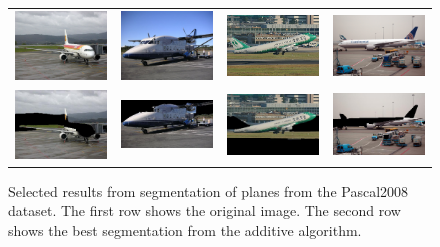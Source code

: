 \documentclass[10pt,twocolumn,letterpaper]{article}
\begin{document}
\begin{figure}[p]
\centering
\begin{tabular}{ p{3cm} p{3cm} p{3cm} p{3cm} }
\includegraphics[width=2.95cm]{figures/add_res/plane/2008_000804.jpg.eps} &
\includegraphics[width=2.95cm]{figures/add_res/plane/2008_001805.jpg.eps} &
\includegraphics[width=2.95cm]{figures/add_res/plane/2008_002358.jpg.eps} &
\includegraphics[width=2.95cm]{figures/add_res/plane/2008_003673.jpg.eps} \\
\includegraphics[width=2.95cm]{figures/add_res/plane/2008_000804.jpg_2_bad.jpg.eps} &
\includegraphics[width=2.95cm]{figures/add_res/plane/2008_001805.jpg_2_okay.jpg.eps} &
\includegraphics[width=2.95cm]{figures/add_res/plane/2008_002358.jpg_2_okay.jpg.eps} &
\includegraphics[width=2.95cm]{figures/add_res/plane/2008_003673.jpg_2_bad.jpg.eps} \\
\end{tabular}
\caption{Selected results from segmentation of planes from the Pascal2008
dataset.  The first row shows the original image.  The second row shows
the best segmentation from the additive algorithm.}
\label{fig:aeroplane_bad_results}
\end{figure}
\end{document}
